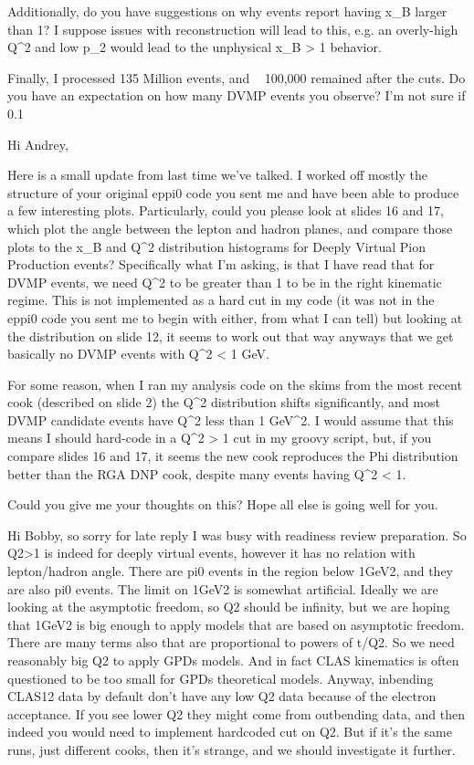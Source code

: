 Additionally, do you have suggestions on why events report having x_B larger than 1? I suppose issues with reconstruction will lead to this, e.g. an overly-high Q^2 and low p_2 would lead to the unphysical x_B > 1 behavior. 

Finally, I processed 135 Million events, and ~ 100,000 remained after the cuts. Do you have an expectation on how many DVMP events you observe? I'm not sure if 0.1%

Hi Andrey,

Here is a small update from last time we've talked. I worked off mostly the structure of your original eppi0 code you sent me and have been able to produce a few interesting plots. Particularly, could you please look at slides 16 and 17, which plot the angle between the lepton and hadron planes, and compare those plots to the x_B and Q^2 distribution histograms for Deeply Virtual Pion Production events? Specifically what I'm asking, is that I have read that for DVMP events, we need Q^2 to be greater than 1 to be in the right kinematic regime. This is not implemented as a hard cut in my code (it was not in the eppi0 code you sent me to begin with either, from what I can tell) but looking at the distribution on slide 12, it seems to work out that way anyways that we get basically no DVMP events with Q^2 < 1 GeV. 

For some reason, when I ran my analysis code on the skims from the most recent cook (described on slide 2) the Q^2 distribution shifts significantly, and most DVMP candidate events have Q^2 less than 1 GeV^2. I would assume that this means I should hard-code in a Q^2 > 1 cut in my groovy script, but, if you compare slides 16 and 17, it seems the new cook reproduces the Phi distribution better than the RGA DNP cook, despite many events having Q^2 < 1. 

Could you give me your thoughts on this? Hope all else is going well for you.


Hi Bobby, so sorry for late reply I was busy with readiness review preparation.
So Q2>1 is indeed for deeply virtual events, however it has no relation with lepton/hadron angle. There are pi0 events in the region below 1GeV2, and they are also pi0 events. The limit on 1GeV2 is somewhat artificial. Ideally we are looking at the asymptotic freedom, so Q2 should be infinity, but we are hoping that 1GeV2 is big enough to apply models that are based on asymptotic freedom. There are many terms also that are proportional to powers of t/Q2. So we need reasonably big Q2 to apply GPDs models. And in fact CLAS kinematics is often questioned to be too small for GPDs theoretical models.
Anyway, inbending CLAS12 data by default don't have any low Q2 data because of the electron acceptance. If you see lower Q2 they might come from outbending data, and then indeed you would need to implement hardcoded cut on Q2. But if it's the same runs, just different cooks, then it's strange, and we should investigate it further.



